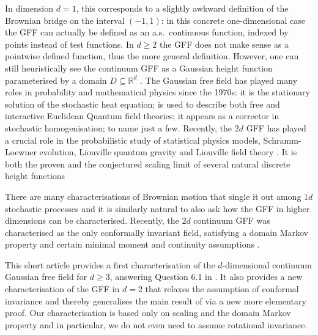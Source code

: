 \documentclass[10pt]{amsart}
\theoremstyle{definition}
\newcommand{\R}{\mathbb{R}}
\begin{document}
In dimension $d = 1$, this corresponds to a slightly awkward definition of the Brownian bridge on the interval $(-1,1)$: in this concrete one-dimensional case the GFF can actually be defined as an a.s.\ continuous function, \ie indexed by points instead of test functions. In $d \geq 2$ the GFF does not make sense as a pointwise defined function, thus the more general definition. However, one can still heuristically see the continuum GFF as a Gaussian height function parameterised by a domain $D \subseteq \R^d$ \cite{SheffieldGFF}. The Gaussian free field has played many roles in probability and mathematical physics since the 1970s: it is the stationary solution of the stochastic heat equation; is used to describe both free and interactive Euclidean Quantum field theories; it appears as a corrector in stochastic homogenisation; to name just a few. Recently, the $2d$ GFF has played a crucial role in the probabilistic study of statistical physics models, Schramm-Loewner evolution, Liouville quantum gravity and Liouville field theory \cite{Dub, MS3, DS11, DKRV}. It is both the proven and the conjectured scaling limit of several natural discrete height functions \cite{NS, Kenyon_GFF, RiderVirag,BLR}

There are many characterisations of Brownian motion that single it out among $1d$ stochastic processes and it is similarly natural to also ask how the GFF in higher dimensions can be characterised. Recently, the $2d$ continuum GFF was characterised as the only conformally invariant field, satisfying a domain Markov property and certain minimal moment and continuity assumptions \cite{BPR18,BPR20}.

This short article provides a first characterisation of the $d$-dimensional continuum Gaussian free field for $d \geq 3$, answering Question 6.1 in \cite{BPR18}. It also provides a new characterisation of the GFF in $d= 2$ that relaxes the assumption of conformal invariance and {thereby generalises the main result of \cite{BPR18} via a new {more elementary} proof}. Our characterisation is based only on {scaling} and the domain Markov property and in particular, we do not even need to assume rotational invariance.
\end{document}
